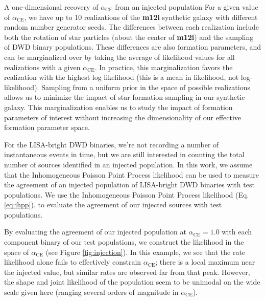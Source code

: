 \documentclass[twocolumn]{aastex631}
\newcommand*{\alphaCE}{\alpha_{\mathrm{CE}}}
\begin{document}
\begin{subsection}{A one-dimensional recovery of $\alphaCE$ from an injected population}
For a given value of $\alphaCE$,
    we have up to 10 realizations of the \textbf{m12i}
    synthetic galaxy
    with different random number generator seeds.
The differences between each realization include
    both the rotation of
    star particles (about the center of \textbf{m12i})
    and the sampling of DWD binary populations.
These differences are also formation parameters,
    and can be marginalized over by taking
    the average of likelihood values for all
    realizations with a given $\alphaCE$.
In practice, this marginalization favors
    the realization with the highest log likelihood
    (this is a mean in likelihood, not log-likelihood).
Sampling from a uniform prior in the space of possible realizations
    allows us to minimize the impact of star formation sampling in
    our synthetic galaxy.
This marginalization enables us to study the impact of
    formation parameters of interest without increasing
    the dimensionality of our effective
    formation parameter space.

For the LISA-bright DWD binaries,
    we're not recording a number of instantaneous events in time,
    but we are still interested in counting the total number
    of sources identified in an injected population. 
In this work, we assume that the Inhomogeneous Poisson Point Process
    likelihood can be used to measure the agreement of an injected
    population of LISA-bright DWD binaries with test populations.
We use the Inhomogeneous Poisson Point Process likelihood
    (Eq. \ref{eq:ihpp}).
    to evaluate the agreement of our injected sources
    with test populations.

By evaluating the agreement of our injected population
    at $\alphaCE = 1.0$
    with each component binary of our test populations,
    we construct the likelihood in the space of $\alphaCE$
    (see Figure \ref{fig:injection}).
In this example, we see that the rate likelihood alone fails to
    effectively constrain $\alphaCE$;
    there is a local maximum near the injected value,
    but similar rates are observed far from that peak.
However, the shape and joint likelihood of the population
    seem to be unimodal on the wide scale given here
    (ranging several orders of magnitude in $\alphaCE$).


\end{subsection}
\end{document}
